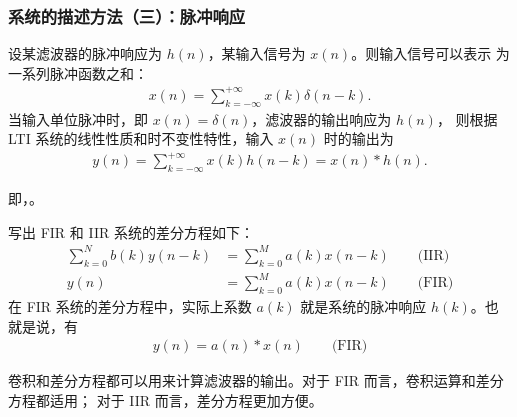 \begin{remark}[滤波器差分方程流图优化]
    
\end{remark}

\begin{example}[二阶非递归滤波器节级联]
    
\end{example}

\begin{definition}
    
\end{definition}

\begin{definition}
    
\end{definition}

\subsubsection{系统的描述方法（三）：脉冲响应}

\label{subsubsection:pulse-response-representation}

\begin{theorem}
    设某滤波器的脉冲响应为 $h(n)$，某输入信号为 $x(n)$。则输入信号可以表示
    为一系列脉冲函数之和：
    \begin{align*}
        x(n) = \sum_{k = -\infty}^{+\infty}x(k)\delta(n - k).
    \end{align*}
    当输入单位脉冲时，即 $x(n) = \delta(n)$，滤波器的输出响应为 $h(n)$，
    则根据 LTI 系统的线性性质和时不变性特性，输入 $x(n)$ 时的输出为
    \begin{align*}
        y(n) = \sum_{k = -\infty}^{+\infty}x(k)h(n - k) = x(n) * h(n).
    \end{align*}
    
    即，。
\end{theorem}

\begin{property}[差分方程与卷积运算]
    \label{property:diff-equation-convolution}
    写出 FIR 和 IIR 系统的差分方程如下：
    \begin{align*}
        \sum_{k = 0}^{N}b(k)y(n - k) & = \sum_{k = 0}^{M}a(k)x(n - k) \qquad \text{(IIR)} \\
        y(n) & = \sum_{k = 0}^{M}a(k)x(n - k) \qquad \text{(FIR)}
    \end{align*}
    在 FIR 系统的差分方程中，实际上系数 $a(k)$ 就是系统的脉冲响应 $h(k)$。也就是说，有
    \begin{align*}
        y(n) = a(n) * x(n) \qquad \text{(FIR)}
    \end{align*}

    卷积和差分方程都可以用来计算滤波器的输出。对于 FIR 而言，卷积运算和差分方程都适用；
    对于 IIR 而言，差分方程更加方便。
\end{property}

